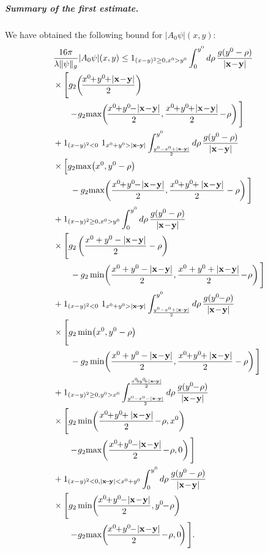 \documentclass[b5paper,draft,openbib,12pt]{memoir}
\newcommand{\vx}{\mathbf{x}}
\newcommand{\vy}{\mathbf{y}}
\begin{document}
\subparagraph{Summary of the first estimate.} We have 
obtained the following bound for $| A_0 \psi |(x,y)$:
\begin{align}
    &\frac{16\pi}{\lambda\|\psi\|_g}|A_0\psi|(x,y) \le 
    1_{(x-y)^2\ge0, x^0>y^0} \int_{0}^{y^0} d\rho \, \frac{ g(y^0-\rho)}{|\vx\!-\!\vy|}\nonumber\\
    &\times \Bigg[ g_2\!\left(\!\frac{x^0\!\!+\!y^0\!\! +\! |\vx\!-\!\vy|}{2}\right)\notag\\
    &\quad\quad \!-\!g_2\!\max\!\left(\!\frac{x^0\!\!+\!y^0\!\!-\! |\vx\!-\!\vy|}{2},\frac{x^0\!\!+\!y^0\!\!+ \!|\vx\!-\!\vy|}{2}\!-\!\rho\right)\Bigg]\nonumber\\
    &+ 1_{(x-y)^2<0}~1_{ x^0+y^0>|\vx\!-\!\vy|} \int_{\frac{y^0-x^0+|\vx\!-\!\vy|}{2}}^{y^0} d\rho \, \frac{ g(y^0-\rho)}{|\vx\!-\!\vy|}\nonumber\\
    &\times \Big[ g_2\!\max\!\left(x^0,y^0-\rho\right)\notag\\
    &\quad\quad -g_2\!\max\!\left(\frac{x^0\!\!+\!y^0\!\!-\!|\vx\!-\!\vy|}{2},\frac{x^0\!\!+\!y^0\!\!+|\vx\!-\!\vy|}{2}-\rho\right)\Bigg]\nonumber\\
    &+ 1_{(x-y)^2\ge0, x^0>y^0} \int_{0}^{y^0} d\rho \, \frac{ g(y^0-\rho)}{|\vx\!-\!\vy|}\nonumber\\
    &\times \Bigg[ g_2\left(\frac{x^0+y^0 - |\vx\!-\!\vy|}{2}-\rho\right)\notag\\
    &\quad\quad -g_2\min\!\left(\frac{x^0+y^0 - |\vx\!-\!\vy|}{2},\frac{x^0+y^0 + |\vx\!-\!\vy|}{2}\!-\!\rho\right)\Bigg]\nonumber\\\nonumber
    &+ 1_{(x-y)^2<0}~1_{ x^0+y^0>|\vx\!-\!\vy|} \int_{\frac{y^0-x^0+|\vx\!-\!\vy|}{2}}^{y^0} d\rho \, \frac{ g(y^0\!\!-\!\rho)}{|\vx\!-\!\vy|}\nonumber\\
    &\times \Bigg[ g_2\min\!\left(x^0,y^0-\rho\right)\notag\\
    &\quad\quad -g_2\min\!\left(\frac{x^0+y^0- |\vx\!-\!\vy|}{2},\frac{x^0\!\!+\!y^0\!\!+ |\vx\!-\!\vy|}{2}-\rho\right)\Bigg]\nonumber\\
    &+1_{(x-y)^2\ge0,y^0>x^0} \int_{\frac{y^0-x^0-|\vx\!-\!\vy|}{2}}^{\frac{x^0\!\!+\!y^0\!\!+|\vx\!-\!\vy|}{2}}d\rho \, \frac{g(y^0\!\!-\!\rho)}{|\vx\!-\!\vy|}\nonumber\\
    &\times \Bigg[g_2 \min\!\left(\frac{x^0\!\!+\!y^0\!\!+|\vx\!-\!\vy|}{2}\!-\!\rho,x^0\right)\notag\\
    &\quad\quad \!-\!g_2\!\max\!\left( \frac{x^0\!\!+\!y^0\!\!-\!|\vx\!-\!\vy|}{2}\!-\!\rho,0 \right) \Bigg]\nonumber\\
    &+1_{(x-y)^2<0,|\vx\!-\!\vy|<x^0+y^0}
    \int_{0}^{y^0}d\rho \,\frac{g(y^0-\rho)}{|\vx\!-\!\vy|}\nonumber\\
    &\times \Bigg[g_2 \min\!\left(\!\frac{x^0\!\!+\!y^0\!\!-\!|\vx\!-\!\vy|}{2},y^0\!\!-\!\rho\right)\notag\\
    &\quad\quad \!-\!g_2\!\max\!\left( \!\frac{x^0\!\!+\!y^0\!\!-\!|\vx\!-\!\vy|}{2}\!-\!\rho,0\!\right)  \Bigg].
\end{align}
\end{document}
